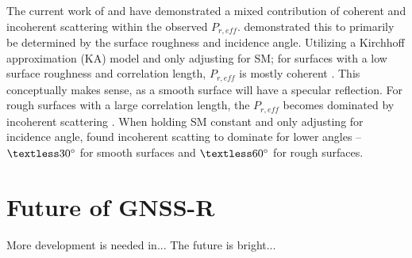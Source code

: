 \documentclass{article}
\begin{document}
The current work of \textcite{Elevation_Angle_Impact} and \textcite{Semiempirical_Modeling} have demonstrated a mixed contribution of coherent and incoherent scattering within the observed $P_{r, eff}$. \citeauthor{Semiempirical_Modeling} demonstrated this to primarily be determined by the surface roughness and incidence angle. Utilizing a Kirchhoff approximation (KA) model and only adjusting for SM; for surfaces with a low surface roughness and correlation length, $P_{r, eff}$ is mostly coherent \cite{Semiempirical_Modeling}. This conceptually makes sense, as a smooth surface will have a specular reflection. For rough surfaces with a large correlation length, the $P_{r, eff}$ becomes dominated by incoherent scattering \cite{Semiempirical_Modeling}. When holding SM constant and only adjusting for incidence angle, \citeauthor{Semiempirical_Modeling} found incoherent scatting to dominate for lower angles -- $\textless 30\degree$ for smooth surfaces and $\textless 60\degree$ for rough surfaces. 

\section{Future of GNSS-R}
More development is needed in...
The future is bright...

\clearpage
\printbibliography
\end{document}
